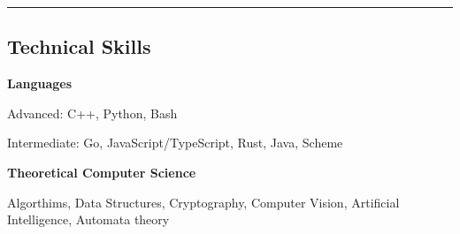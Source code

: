 \documentclass[10pt,letterpaper]{article}
\newenvironment{indentsection}[1]%
{\begin{list}{}%
	{\setlength{\leftmargin}{#1}}%
	\item[]%
}
{\end{list}}
\begin{document}
\hrule
\vspace{-1em}

\subsection*{Technical Skills}

\begin{indentsection}{\parindent}
\begin{description*}
	\item
	{\textbf{Languages}}

	\begin{itemize*}
        \item {Advanced: C++, Python, Bash}
        \item {Intermediate: Go, JavaScript/TypeScript, Rust, Java, Scheme}
	\end{itemize*}

	\item
	{\textbf{Theoretical Computer Science}}

	Algorthims, Data Structures, Cryptography, Computer Vision, Artificial Intelligence, Automata theory
\end{description*}
\end{indentsection}
\end{document}
